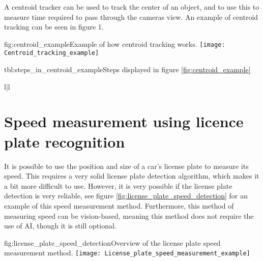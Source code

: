 A centroid tracker can be used to track the center of an object, and to use this to measure time required to pass through the cameras view. An example 
of centroid tracking can be seen in figure 1.

\begin{linfigure}{fig:centroid_example}{Example of how centroid tracking works.}
    \texttt{[image: Centroid\_tracking\_example]}
\end{linfigure}

\begin{lintable}{tbl:steps_in_centroid_example}{Steps displayed in figure \ref{fig:centroid_example}}
    \begin{lintabular}{l|l}
    \end{lintabular}
\end{lintable}

\newpage

\section{Speed measurement using licence plate recognition}
It is possible to use the position and size of a car's license plate to measure its speed. This requires a very solid license plate detection 
algorithm, which makes it a bit more difficult to use. However, it is very possible if the license plate detection is very reliable, see
figure \ref{fig:license_plate_speed_detection} for an example of this speed measurement method. Furthermore, this method of measuring speed
can be vision-based, meaning this method does not require the use of AI, though it is still optional.

\begin{linfigure}{fig:license_plate_speed_detection}{Overview of the license plate speed measurement method.}
    \texttt{[image: License\_plate\_speed\_measurement\_example]}
\end{linfigure}
